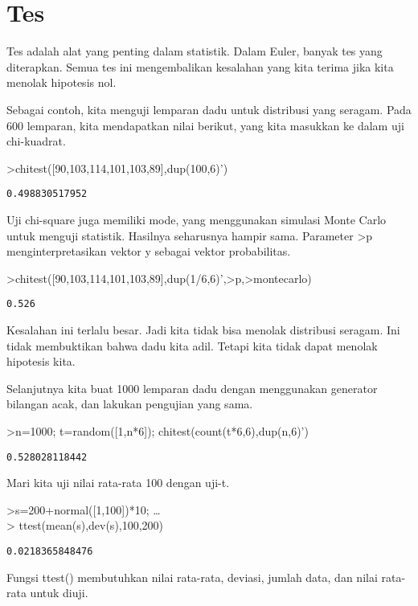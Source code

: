\documentclass[
]{book}
\begin{document}
\chapter{Tes}\label{tes}

Tes adalah alat yang penting dalam statistik. Dalam Euler, banyak tes yang diterapkan. Semua tes ini mengembalikan kesalahan yang kita terima jika kita menolak hipotesis nol.

Sebagai contoh, kita menguji lemparan dadu untuk distribusi yang seragam. Pada 600 lemparan, kita mendapatkan nilai berikut, yang kita masukkan ke dalam uji chi-kuadrat.

\textgreater chitest({[}90,103,114,101,103,89{]},dup(100,6)')

\begin{verbatim}
0.498830517952
\end{verbatim}

Uji chi-square juga memiliki mode, yang menggunakan simulasi Monte Carlo untuk menguji statistik. Hasilnya seharusnya hampir sama. Parameter \textgreater p menginterpretasikan vektor y sebagai vektor probabilitas.

\textgreater chitest({[}90,103,114,101,103,89{]},dup(1/6,6)',\textgreater p,\textgreater montecarlo)

\begin{verbatim}
0.526
\end{verbatim}

Kesalahan ini terlalu besar. Jadi kita tidak bisa menolak distribusi seragam. Ini tidak membuktikan bahwa dadu kita adil. Tetapi kita tidak dapat menolak hipotesis kita.

Selanjutnya kita buat 1000 lemparan dadu dengan menggunakan generator bilangan acak, dan lakukan pengujian yang sama.

\textgreater n=1000; t=random({[}1,n*6{]}); chitest(count(t*6,6),dup(n,6)')

\begin{verbatim}
0.528028118442
\end{verbatim}

Mari kita uji nilai rata-rata 100 dengan uji-t.

\textgreater s=200+normal({[}1,100{]})*10; \ldots{}\\
\textgreater{} ttest(mean(s),dev(s),100,200)

\begin{verbatim}
0.0218365848476
\end{verbatim}

Fungsi ttest() membutuhkan nilai rata-rata, deviasi, jumlah data, dan nilai rata-rata untuk diuji.
\end{document}
